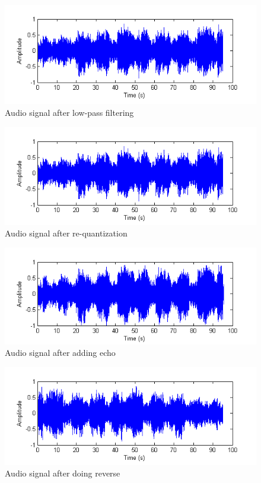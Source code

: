 \documentclass[12pt,a4paper]{report}
\begin{document}
\begin{figure}[h!]
\centering
\includegraphics[scale=0.8]{image/lpf.png}
\caption{Audio signal after low-pass filtering}
\label{fig:lpf}
\end{figure}

\begin{figure}[h!]
\centering
\includegraphics[scale=0.8]{image/requantized.png}
\caption{Audio signal after re-quantization}
\label{fig:requantized}
\end{figure}

\newpage

\begin{figure}[h!]
\centering
\includegraphics[scale=0.8]{image/echo.png}
\caption{Audio signal after adding echo}
\label{fig:echo}
\end{figure}

\begin{figure}[h!]
\centering
\includegraphics[scale=0.8]{image/reverse.png}
\caption{Audio signal after doing reverse}
\label{fig:reverse}
\end{figure}
\end{document}

